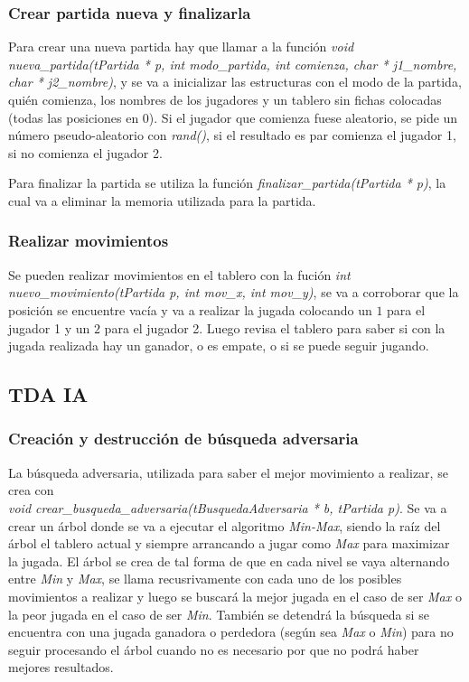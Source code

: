 \documentclass[12pt,a4paper]{article}
\begin{document}
\subsubsection{Crear partida nueva y finalizarla}
Para crear una nueva partida hay que llamar a la funci\'on \emph{void nueva\_partida(tPartida * p, int modo\_partida, int comienza, char * j1\_nombre, char * j2\_nombre)}, y se va a inicializar las estructuras con el modo de la partida, qui\'en comienza, los nombres de los jugadores y un tablero sin fichas colocadas (todas las posiciones en $0$). Si el jugador que comienza fuese aleatorio, se pide un n\'umero pseudo-aleatorio con \emph{rand()}, si el resultado es par comienza el jugador 1, si no comienza el jugador 2.

Para finalizar la partida se utiliza la funci\'on \emph{finalizar\_partida(tPartida * p)}, la cual va a eliminar la memoria utilizada para la partida.

\subsubsection{Realizar movimientos}
Se pueden realizar movimientos en el tablero con la fuci\'on \emph{int nuevo\_movimiento(tPartida p, int mov\_x, int mov\_y)}, se va a corroborar que la posici\'on se encuentre vac\'ia y va a realizar la jugada colocando un $1$ para el jugador 1 y un $2$ para el jugador 2. Luego revisa el tablero para saber si con la jugada realizada hay un ganador, o es empate, o si se puede seguir jugando.

\subsection{TDA IA}
\subsubsection{Creaci\'on y destrucci\'on de b\'usqueda adversaria}
La b\'usqueda adversaria, utilizada para saber el mejor movimiento a realizar, se crea con \\\emph{void crear\_busqueda\_adversaria(tBusquedaAdversaria * b, tPartida p)}. Se va a crear un \'arbol donde se va a ejecutar el algoritmo \emph{Min-Max}, siendo la ra\'iz del \'arbol el tablero actual y siempre arrancando a jugar como \emph{Max} para maximizar la jugada. El \'arbol se crea de tal forma de que en cada nivel se vaya alternando entre \emph{Min} y \emph{Max}, se llama recusrivamente con cada uno de los posibles movimientos a realizar y luego se buscar\'a la mejor jugada en el caso de ser \emph{Max} o la peor jugada en el caso de ser \emph{Min}. Tambi\'en se detendr\'a la b\'usqueda si se encuentra con una jugada ganadora o perdedora (seg\'un sea \emph{Max} o \emph{Min}) para no seguir procesando el \'arbol cuando no es necesario por que no podr\'a haber mejores resultados.
\end{document}
